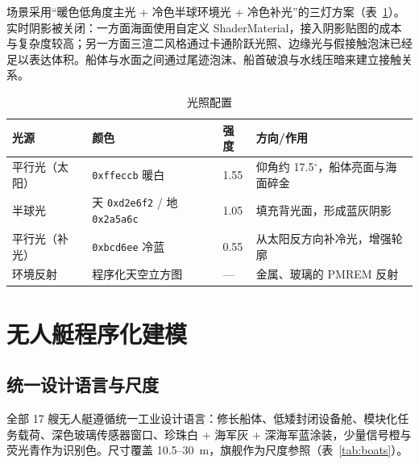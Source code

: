 \documentclass[UTF8, a4paper, 11pt]{ctexart}
\begin{document}
场景采用“暖色低角度主光 + 冷色半球环境光 + 冷色补光”的三灯方案（表~\ref{tab:lights}）。实时阴影被关闭：一方面海面使用自定义 ShaderMaterial，接入阴影贴图的成本与复杂度较高；另一方面三渲二风格通过卡通阶跃光照、边缘光与假接触泡沫已经足以表达体积。船体与水面之间通过尾迹泡沫、船首破浪与水线压暗来建立接触关系。

\begin{table}[H]
\centering
\caption{光照配置}
\label{tab:lights}
\small
\begin{tabular}{@{}llll@{}}
\toprule
\textbf{光源} & \textbf{颜色} & \textbf{强度} & \textbf{方向/作用} \\
\midrule
平行光（太阳） & \texttt{0xffeccb} 暖白 & 1.55 & 仰角约 17.5$^\circ$，船体亮面与海面碎金 \\
半球光 & 天 \texttt{0xd2e6f2} / 地 \texttt{0x2a5a6c} & 1.05 & 填充背光面，形成蓝灰阴影 \\
平行光（补光） & \texttt{0xbcd6ee} 冷蓝 & 0.55 & 从太阳反方向补冷光，增强轮廓 \\
环境反射 & 程序化天空立方图 & — & 金属、玻璃的 PMREM 反射 \\
\bottomrule
\end{tabular}
\end{table}

\section{无人艇程序化建模}

\subsection{统一设计语言与尺度}

全部 17 艘无人艇遵循统一工业设计语言：修长船体、低矮封闭设备舱、模块化任务载荷、深色玻璃传感器窗口、珍珠白 + 海军灰 + 深海军蓝涂装，少量信号橙与荧光青作为识别色。尺寸覆盖 10.5--30~m，旗舰作为尺度参照（表~\ref{tab:boats}）。
\end{document}
